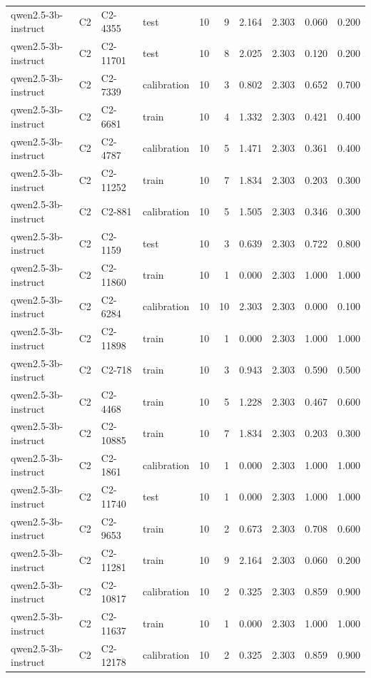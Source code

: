 \begin{table}
\begin{tabular}{llllrrrrrr}
qwen2.5-3b-instruct & C2 & C2-4355 & test & 10 & 9 & 2.164 & 2.303 & 0.060 & 0.200 \\
qwen2.5-3b-instruct & C2 & C2-11701 & test & 10 & 8 & 2.025 & 2.303 & 0.120 & 0.200 \\
qwen2.5-3b-instruct & C2 & C2-7339 & calibration & 10 & 3 & 0.802 & 2.303 & 0.652 & 0.700 \\
qwen2.5-3b-instruct & C2 & C2-6681 & train & 10 & 4 & 1.332 & 2.303 & 0.421 & 0.400 \\
qwen2.5-3b-instruct & C2 & C2-4787 & calibration & 10 & 5 & 1.471 & 2.303 & 0.361 & 0.400 \\
qwen2.5-3b-instruct & C2 & C2-11252 & train & 10 & 7 & 1.834 & 2.303 & 0.203 & 0.300 \\
qwen2.5-3b-instruct & C2 & C2-881 & calibration & 10 & 5 & 1.505 & 2.303 & 0.346 & 0.300 \\
qwen2.5-3b-instruct & C2 & C2-1159 & test & 10 & 3 & 0.639 & 2.303 & 0.722 & 0.800 \\
qwen2.5-3b-instruct & C2 & C2-11860 & train & 10 & 1 & 0.000 & 2.303 & 1.000 & 1.000 \\
qwen2.5-3b-instruct & C2 & C2-6284 & calibration & 10 & 10 & 2.303 & 2.303 & 0.000 & 0.100 \\
qwen2.5-3b-instruct & C2 & C2-11898 & train & 10 & 1 & 0.000 & 2.303 & 1.000 & 1.000 \\
qwen2.5-3b-instruct & C2 & C2-718 & train & 10 & 3 & 0.943 & 2.303 & 0.590 & 0.500 \\
qwen2.5-3b-instruct & C2 & C2-4468 & train & 10 & 5 & 1.228 & 2.303 & 0.467 & 0.600 \\
qwen2.5-3b-instruct & C2 & C2-10885 & train & 10 & 7 & 1.834 & 2.303 & 0.203 & 0.300 \\
qwen2.5-3b-instruct & C2 & C2-1861 & calibration & 10 & 1 & 0.000 & 2.303 & 1.000 & 1.000 \\
qwen2.5-3b-instruct & C2 & C2-11740 & test & 10 & 1 & 0.000 & 2.303 & 1.000 & 1.000 \\
qwen2.5-3b-instruct & C2 & C2-9653 & train & 10 & 2 & 0.673 & 2.303 & 0.708 & 0.600 \\
qwen2.5-3b-instruct & C2 & C2-11281 & train & 10 & 9 & 2.164 & 2.303 & 0.060 & 0.200 \\
qwen2.5-3b-instruct & C2 & C2-10817 & calibration & 10 & 2 & 0.325 & 2.303 & 0.859 & 0.900 \\
qwen2.5-3b-instruct & C2 & C2-11637 & train & 10 & 1 & 0.000 & 2.303 & 1.000 & 1.000 \\
qwen2.5-3b-instruct & C2 & C2-12178 & calibration & 10 & 2 & 0.325 & 2.303 & 0.859 & 0.900 \\

\end{tabular}
\end{table}

